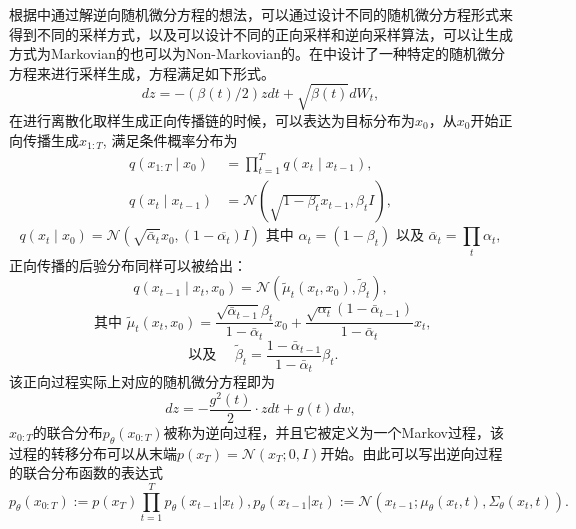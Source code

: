 根据\cite{score_based_SDE}中通过解逆向随机微分方程的想法，可以通过设计不同的随机微分方程形式来得到不同的采样方式，以及可以设计不同的正向采样和逆向采样算法，可以让生成方式为Markovian的也可以为Non-Markovian的。在\cite{DDPM}中设计了一种特定的随机微分方程来进行采样生成，方程满足如下形式。
\begin{equation}
    dz = -\left(\beta(t)/2\right)z dt + \sqrt{\beta(t)}dW_t,
    \label{DDPM Equation}
\end{equation}
在进行离散化取样生成正向传播链的时候，可以表达为目标分布为$x_0$，从$x_0$开始正向传播生成$x_{1:T}$, 满足条件概率分布为
\begin{align}
    q\left(x_{1: T} \mid x_0\right)&=\prod_{t=1}^T q\left(x_t \mid x_{t-1}\right),\\
        q\left(x_t \mid x_{t-1}\right)&=\mathcal{N}\left(\sqrt{1-\beta_t} x_{t-1}, \beta_t I\right),
        \end{align}
        \begin{equation}
            q\left(x_t \mid x_0\right)=\mathcal{N}\left(\sqrt{\bar{\alpha}_t} x_0,\left(1-\overline{\alpha_t}\right) I\right) \text { 其中 } \alpha_t=\left(1-\beta_t\right) \text { 以及 } \bar{\alpha}_t=\prod_t \alpha_t,
            \label{posterior of xt}
            \end{equation}
    正向传播的后验分布同样可以被给出：
    \begin{equation}
        q\left(x_{t-1} \mid x_t, x_0\right)=\mathcal{N}\left(\tilde{\mu}_t\left(x_t, x_0\right), \tilde{\beta}_t\right),
        \label{posterior xt 2}
        \end{equation}
        \begin{equation}
            \text {     其中 } \tilde{\mu}_t\left(x_t, x_0\right)=\frac{\sqrt{\bar{\alpha}_{t-1}} \beta_t}{1-\bar{\alpha}_t} x_0+\frac{\sqrt{\alpha_t}\left(1-\bar{\alpha}_{t-1}\right)}{1-\bar{\alpha}_t} x_t,
            \end{equation}
            \begin{equation}
                \text { 以及 } \quad \tilde{\beta}_t=\frac{1-\bar{\alpha}_{t-1}}{1-\bar{\alpha}_t} \beta_t.
                \end{equation}
该正向过程实际上对应的随机微分方程即为
\begin{equation}
    dz = -\frac{g^2(t)}{2}\cdot  z dt + g(t)dw,
\end{equation}
$x_{0:T}$的联合分布$p_{\theta}(x_{0:T})$被称为逆向过程，并且它被定义为一个Markov过程，该过程的转移分布可以从末端$p(x_T)= \mathcal{N}(x_T;0,I) $开始。由此可以写出逆向过程的联合分布函数的表达式
\begin{equation}
    p_{\theta}(x_{0:T}) := p(x_T)\prod_{t=1}^{T}p_{\theta}(x_{t-1}|x_t), p_{\theta}(x_{t-1}|x_t) :=\mathcal{N}(x_{t-1};\mu_{\theta}(x_t,t),\Sigma_{\theta}(x_t,t)).  
\end{equation}

